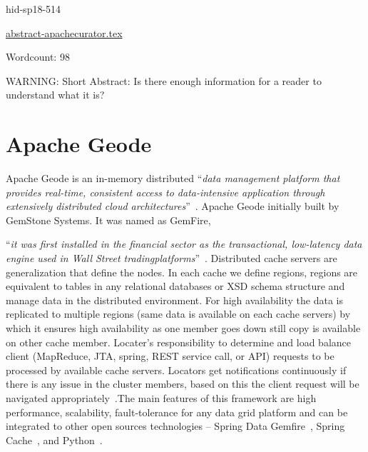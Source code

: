 \begin{IU}

hid-sp18-514

\href{https://github.com/cloudmesh-community/hid-sp18-514/blob/master//technology/abstract-apachecurator.tex}{abstract-apachecurator.tex}

 

Wordcount: 98

WARNING: Short Abstract: Is there enough information for a reader to understand what it is?

\end{IU}

\section{Apache Geode}

Apache Geode is an in-memory distributed \color{blue}``\emph{data management platform
that provides real-time, consistent access to data-intensive
application through extensively distributed cloud
architectures}''\color{black}~\cite{hid-sp18-514-apachegeodewiki}. Apache Geode
initially built by GemStone Systems. It was named as GemFire, 

\color{blue}``\emph{it was
first installed in the financial sector as the transactional,
low-latency data engine used in Wall Street tradingplatforms}''\color{black}~\cite{hid-sp18-514-apachegeodewiki}.
Distributed cache servers are generalization that define the nodes. In
each cache we define regions, regions are equivalent to tables in any
relational databases or XSD schema structure and manage data in the
distributed environment. For high availability the data is replicated
to multiple regions (same data is available on each cache servers) by
which it ensures high availability as one member goes down still copy
is available on other cache member. Locater’s responsibility to
determine and load balance client (MapReduce, JTA, spring, REST service
call, or API) requests to be processed by available cache servers.
Locators get notifications continuously if there is any issue in the
cluster members, based on this the client request will be navigated
appropriately~\cite{hid-sp18-514-apachegeodewiki}.The main features of
this framework are high performance, scalability, fault-tolerance for
any data grid platform and can be integrated to other open sources
technologies – Spring Data
Gemfire~\cite{hid-sp18-514-geodespringgemfire}, Spring
Cache~\cite{hid-sp18-514-geodespringcache}, and
Python~\cite{hid-sp18-514-geodepython}.


